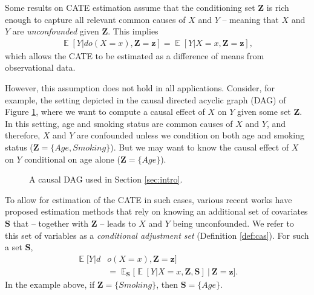 \documentclass[twoside]{article}
\DeclareMathOperator{\E}{\mathbb{E}}
\newcommand{\mb}[1]{\mathbf{#1}}
\begin{document}
Some results on CATE estimation assume that the conditioning set $\mb{Z}$ is rich enough to capture all relevant common causes of $X$ and $Y$ -- meaning that $X$ and $Y$ are \textit{unconfounded} given $\mb{Z}$. This implies 
\begin{align}
    \E[Y | do(X=x), \mb{Z} = \mb{z}] =\E[Y | X=x, \mb{Z} =\mb{z}], \label{eq:cate-claim-1}
\end{align}
 which allows the CATE to be estimated as a difference of means from observational data. 

However, this assumption does not hold in all applications. Consider, for example, the setting depicted in the causal directed acyclic graph (DAG) of Figure \ref{fig:intro}, where we want to compute a causal effect of $X$ on $Y$ given some set $\mb{Z}$. In this setting, age and smoking status are common causes of $X$ and $Y$, and therefore, $X$ and $Y$ are confounded unless we condition on both age and smoking status ($\mb{Z} = \{Age, Smoking\}$). But we may want to know the causal effect of $X$ on $Y$ conditional on age alone ($\mb{Z} =\{Age\}$). 


\begin{figure}
        \centering
    \caption{A causal DAG used in Section \ref{sec:intro}.}
    \label{fig:intro}
\end{figure}

To allow for estimation of the CATE in such cases, various recent works \citep{abrevaya2015estimating, fan2022estimation,chernozhukov2023simple, smucler2020efficient} have proposed estimation methods that rely on knowing an additional set of covariates $\mb{S}$ that -- together with $\mb{Z}$ -- leads to $X$ and $Y$ being unconfounded. We refer to this set of variables as a \textit{conditional adjustment set} (Definition \ref{def:cas}). For such a set $\mb{S}$, 
\begin{align}
    \E[Y| d&o(X=x), \mb{Z} = \mb{z}] \label{eq:cate-claim-2} \\ 
            &= \E_{\mb{S}} \Big[ \E [Y| X=x, \mb{Z} , \mb{S}] \ \Big| \ \mb{Z} = \mb{z} \Big]. \nonumber
\end{align}
In the example above, if $\mb{Z} = \{Smoking\}$, then $\mb{S} = \{Age\}$.
\end{document}
